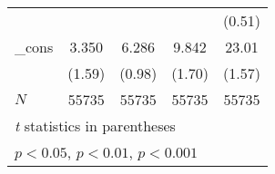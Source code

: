 \begin{tabular}{l*{4}{c}}
            &                     &                     &                     &      (0.51)         \\
[1em]
\_cons      &       3.350         &       6.286         &       9.842         &       23.01         \\
            &      (1.59)         &      (0.98)         &      (1.70)         &      (1.57)         \\
\hline
\(N\)       &       55735         &       55735         &       55735         &       55735         \\
\hline\hline
\multicolumn{5}{l}{\footnotesize \textit{t} statistics in parentheses}\\
\multicolumn{5}{l}{\footnotesize \sym{*} \(p<0.05\), \sym{**} \(p<0.01\), \sym{***} \(p<0.001\)}\\
\end{tabular}
